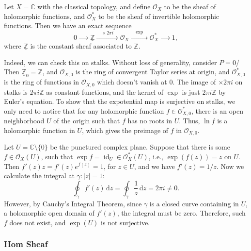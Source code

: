 \documentclass[11pt]{article}
\newcommand{\id}{\operatorname{id}}
\begin{document}
\begin{example}
  \cite[Example 2.4.10]{vakilTheRisingSea}
  Let $X=\mathbb{C}$ with the classical topology, 
  and define $\mathscr{O}_{X}$ to be the sheaf of holomorphic functions, 
  and $\mathscr{O}_{X}^{*}$ to be the sheaf of invertible holomorphic functions. 
  Then we have an exact sequence 
  $$0 \xrightarrow{\quad \quad} \underline{\mathbb{Z}} 
  \xrightarrow{\quad \times 2 \pi i \quad} \mathscr{O}_{X} 
  \xrightarrow{\quad \mathrm{exp} \quad} \mathscr{O}_{X}^{*} 
  \xrightarrow{\quad  \quad}1,$$
  where $\underline{\mathbb{Z}}$ is the constant sheaf associated to $\mathbb{Z}$. 

  Indeed, we can check this on stalks. Without loss of generality, consider $ P=0 $/ 
  Then $ \underline{\mathbb{Z}}_{0} = \mathbb{Z} $, 
  and $ \mathscr{O}_{X,0} $ is the ring of convergent Taylor series at origin, 
  and $ \mathscr{O}_{X,0}^{*} $ is the ring of functions in $  \mathscr{O}_{X,0} $ 
  which doesn't vanish at $ 0 $. The image of $ \times 2 \pi i $ on stalks 
  is $ 2 \pi i \mathbb{Z}$ as constant functions, and the kernel of $ \exp $ is just 
  $ 2 \pi i \mathbb{Z} $ by Euler's equation. 
  To show that the expotential map is surjective on stalks, we only need to notice that 
  for any holomorphic function $ f \in \mathscr{O}_{X,0}^{*} $, 
  there is an open neighborhood $ U $ of the origin such that $ f $ has no roots in $ U $. 
  Thus, $ \ln f $ is a holomorphic function in $ U $, which gives the preimage of $ f $ 
  in $ \mathscr{O}_{X,0} $. 

  Let $ U = \mathbb{C} \setminus \{0\} $ be the punctured complex plane. 
  Suppose that there is some $ f \in \mathscr{O}_{X}(U) $, such that 
  $ \exp f = \id_{U} \in \mathscr{O}_{X}^{*}(U)$, i.e., $ \exp(f(z))=z $ on $ U $. 
  Then $ f'(z)z = f'(z) e^{f(z)} = 1 $, for $ z \in U $, and we have $ f'(z) = 1/z $. 
  Now we calculate the integral at 
  $\gamma:|z|=1$: 
  $$\oint_{\gamma} f'(z) \,\mathrm{d}z = \oint_{\gamma} \frac{1}{z} \,
  \mathrm{d}z =2 \pi i  \neq 0.$$
  However, by Cauchy's Integral Theorem, since $\gamma$ is a closed curve 
  containing in $U$, a holomorphic open domain of $f'(z)$, 
  the integral must be zero. 
  Therefore, such $f$ does not exist, and $\exp(U)$ is not surjective. 
\end{example}

\subsubsection{Hom Sheaf}
\end{document}
